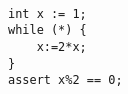 \begin{lstlisting}[]  % Start your code-block
	
int x := 1;
while (*) {
    x:=2*x;
}
assert x%2 == 0;
\end{lstlisting}